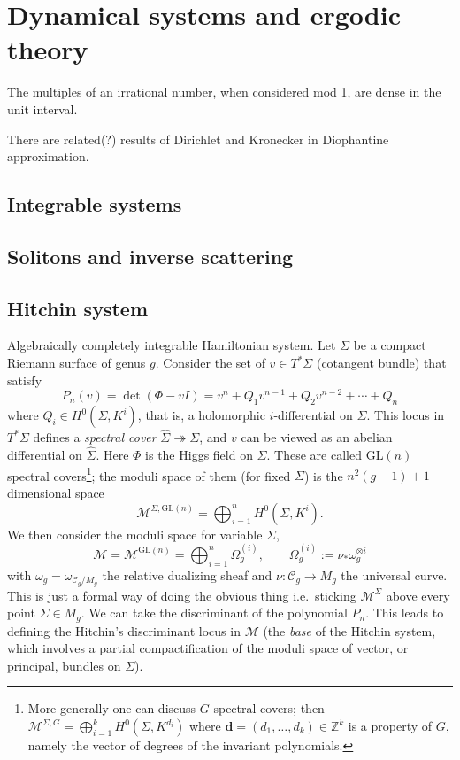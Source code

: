 \section{Dynamical systems and ergodic theory}

\begin{example}
The multiples of an irrational number, when considered mod 1, are dense in the unit interval.
\end{example}

There are related(?) results of Dirichlet and Kronecker in Diophantine approximation.

\subsection{Integrable systems}

\subsection{Solitons and inverse scattering}

\subsection{Hitchin system}

Algebraically completely integrable Hamiltonian system. Let $\Sigma$ be a compact Riemann surface of genus $g$. Consider the set of $v \in T^* \Sigma$ (cotangent bundle) that satisfy
\[ P_n(v) = \det(\Phi - vI) = v^n + Q_1 v^{n-1} + Q_2 v^{n-2} + \cdots + Q_n \]
where $Q_i \in H^0(\Sigma, K^i)$, that is, a holomorphic $i$-differential on $\Sigma$. This locus in $T^* \Sigma$ defines a \emph{spectral cover} $\widehat{\Sigma} \twoheadrightarrow \Sigma$, and $v$ can be viewed as an abelian differential on $\widehat{\Sigma}$. Here $\Phi$ is the Higgs field on $\Sigma$. These are called $\mathrm{GL}(n)$ spectral covers\footnote{More generally one can discuss $G$-spectral covers; then $\mathcal{M}^{\Sigma,G} = \bigoplus_{i=1}^k H^0(\Sigma, K^{d_i})$ where $\mathbf{d} = (d_1,\ldots,d_k) \in \mathbb{Z}^k$ is a property of $G$, namely the vector of degrees of the invariant polynomials.}; the moduli space of them (for fixed $\Sigma$) is the $n^2(g-1)+1$ dimensional space \[ \mathcal{M}^{\Sigma,\mathrm{GL}(n)} = \bigoplus_{i=1}^n H^0(\Sigma, K^i). \]
We then consider the moduli space for variable $\Sigma$,
\[ \mathcal{M} = \mathcal{M}^{\mathrm{GL}(n)} = \bigoplus_{i=1}^n \Omega_g^{(i)}, \qquad \Omega_g^{(i)} := \nu_* \omega_g^{\otimes i} \]
with $\omega_g = \omega_{\mathcal{C}_g/M_g}$ the relative dualizing sheaf and $\nu : \mathcal{C}_g \to M_g$ the universal curve. This is just a formal way of doing the obvious thing i.e.\ sticking $\mathcal{M}^\Sigma$ above every point $\Sigma \in M_g$. We can take the discriminant of the polynomial $P_n$. This leads to defining the Hitchin's discriminant locus in $\mathcal{M}$ (the \emph{base} of the Hitchin system, which involves a partial compactification of the moduli space of vector, or principal, bundles on $\Sigma$).

